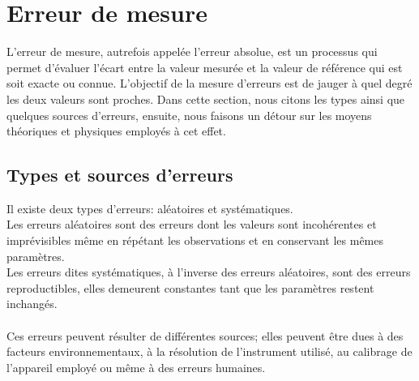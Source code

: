 \documentclass[a4paper, 12pt]{book}
\begin{document}
\section{Erreur de mesure}
L'erreur de mesure, autrefois appelée l'erreur absolue, est un processus qui permet d'évaluer l'écart entre la valeur mesurée et la valeur de référence qui est soit exacte ou connue. L'objectif de la mesure d'erreurs est de jauger à quel degré les deux valeurs sont proches. 
Dans cette section, nous citons les types ainsi que quelques sources d'erreurs, ensuite,  nous faisons un détour sur les moyens théoriques et physiques employés à cet effet.
\subsection{Types et sources d'erreurs}
Il existe deux types d'erreurs: aléatoires et systématiques. \\ Les erreurs aléatoires sont des erreurs dont les valeurs sont incohérentes et imprévisibles même en répétant les observations et en conservant les mêmes paramètres. \\Les erreurs dites systématiques, à l'inverse des erreurs aléatoires, sont des erreurs reproductibles, elles demeurent constantes tant que les paramètres restent inchangés. \\ \\
Ces erreurs peuvent résulter de différentes sources; elles peuvent être dues à des facteurs environnementaux, à la résolution de l'instrument utilisé, au calibrage de l'appareil employé ou même à des erreurs humaines. \\ \\
\end{document}
